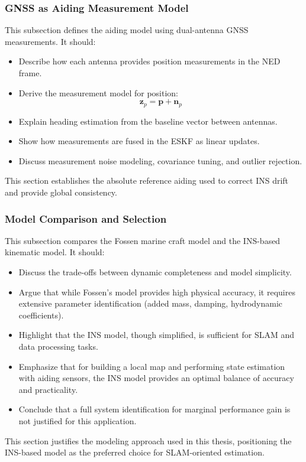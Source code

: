\subsubsection{GNSS as Aiding Measurement Model}
This subsection defines the aiding model using dual-antenna GNSS measurements. It should:
\begin{itemize}
    \item Describe how each antenna provides position measurements in the NED frame.
    \item Derive the measurement model for position:
    $$
    \mathbf{z}_p = \mathbf{p} + \mathbf{n}_p
    $$
    \item Explain heading estimation from the baseline vector between antennas.
    \item Show how measurements are fused in the ESKF as linear updates.
    \item Discuss measurement noise modeling, covariance tuning, and outlier rejection.
\end{itemize}
This section establishes the absolute reference aiding used to correct INS drift and provide global consistency.



\subsubsection{Model Comparison and Selection}
This subsection compares the Fossen marine craft model and the INS-based kinematic model. It should:
\begin{itemize}
    \item Discuss the trade-offs between dynamic completeness and model simplicity.
    \item Argue that while Fossen’s model provides high physical accuracy, it requires extensive parameter identification (added mass, damping, hydrodynamic coefficients).
    \item Highlight that the INS model, though simplified, is sufficient for SLAM and data processing tasks.
    \item Emphasize that for building a local map and performing state estimation with aiding sensors, the INS model provides an optimal balance of accuracy and practicality.
    \item Conclude that a full system identification for marginal performance gain is not justified for this application.
\end{itemize}
This section justifies the modeling approach used in this thesis, positioning the INS-based model as the preferred choice for SLAM-oriented estimation.

